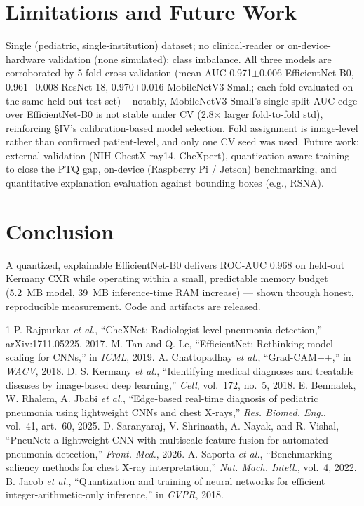 \documentclass[conference]{IEEEtran}
\begin{document}
\section{Limitations and Future Work}
Single (pediatric, single-institution) dataset; no clinical-reader or
on-device-hardware validation (none simulated); class imbalance. All three models are
corroborated by 5-fold cross-validation (mean AUC 0.971$\pm$0.006 EfficientNet-B0,
0.961$\pm$0.008 ResNet-18, 0.970$\pm$0.016 MobileNetV3-Small; each fold evaluated on the
same held-out test set) -- notably, MobileNetV3-Small's single-split AUC edge over
EfficientNet-B0 is not stable under CV (2.8$\times$ larger fold-to-fold std), reinforcing
\S IV's calibration-based model selection. Fold assignment is image-level rather than
confirmed patient-level, and only one CV seed was used. Future work: external
validation (NIH ChestX-ray14, CheXpert), quantization-aware training to close the PTQ
gap, on-device (Raspberry Pi / Jetson) benchmarking, and quantitative explanation
evaluation against bounding boxes (e.g., RSNA).

\section{Conclusion}
A quantized, explainable EfficientNet-B0 delivers ROC-AUC 0.968 on held-out Kermany CXR
while operating within a small, predictable memory budget (5.2~MB model, 39~MB
inference-time RAM increase) --- shown through honest, reproducible measurement. Code and artifacts
are released.

\begin{thebibliography}{1}
 P. Rajpurkar \emph{et al.}, ``CheXNet: Radiologist-level pneumonia detection,'' arXiv:1711.05225, 2017.
 M. Tan and Q. Le, ``EfficientNet: Rethinking model scaling for CNNs,'' in \emph{ICML}, 2019.
 A. Chattopadhay \emph{et al.}, ``Grad-CAM++,'' in \emph{WACV}, 2018.
 D. S. Kermany \emph{et al.}, ``Identifying medical diagnoses and treatable diseases by image-based deep learning,'' \emph{Cell}, vol.~172, no.~5, 2018.
 E. Benmalek, W. Rhalem, A. Jbabi \emph{et al.}, ``Edge-based real-time diagnosis of pediatric pneumonia using lightweight CNNs and chest X-rays,'' \emph{Res. Biomed. Eng.}, vol.~41, art.~60, 2025.
 D. Saranyaraj, V. Shrinaath, A. Nayak, and R. Vishal, ``PneuNet: a lightweight CNN with multiscale feature fusion for automated pneumonia detection,'' \emph{Front. Med.}, 2026.
 A. Saporta \emph{et al.}, ``Benchmarking saliency methods for chest X-ray interpretation,'' \emph{Nat. Mach. Intell.}, vol.~4, 2022.
 B. Jacob \emph{et al.}, ``Quantization and training of neural networks for efficient integer-arithmetic-only inference,'' in \emph{CVPR}, 2018.
\end{thebibliography}
\end{document}
